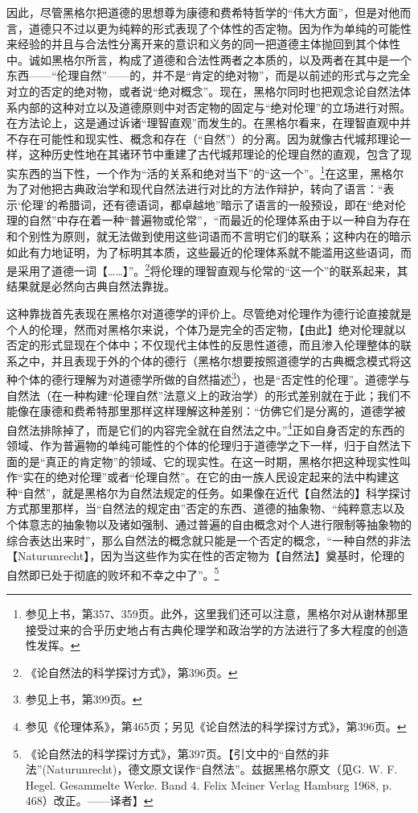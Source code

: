 因此，尽管黑格尔把道德的思想尊为康德和费希特哲学的“伟大方面”，但是对他而言，道德只不过以更为纯粹的形式表现了个体性的否定物。因为作为单纯的可能性来经验的并且与合法性分离开来的意识和义务的同一把道德主体抛回到其个体性中。诚如黑格尔所言，构成了道德和合法性两者之本质的，以及两者在其中是一个东西——“伦理自然”——的，并不是“肯定的绝对物”，而是以前述的形式与之完全对立的否定的绝对物，或者说“绝对概念”。现在，黑格尔同时也把观念论自然法体系内部的这种对立以及道德原则中对否定物的固定与“绝对伦理”的立场进行对照。在方法论上，这是通过诉诸“理智直观”而发生的。在黑格尔看来，在理智直观中并不存在可能性和现实性、概念和存在（“自然”）的分离。因为就像古代城邦理论一样，这种历史性地在其诸环节中重建了古代城邦理论的伦理自然的直观，包含了现实东西的当下性，一个作为“活的关系和绝对当下”的“这一个”。\footnote{参见上书，第357、359页。此外，这里我们还可以注意，黑格尔对从谢林那里接受过来的合乎历史地占有古典伦理学和政治学的方法进行了多大程度的创造性发挥。}在这里，黑格尔为了对他把古典政治学和现代自然法进行对比的方法作辩护，转向了语言：“表示‘伦理’的希腊词，还有德语词，都卓越地”暗示了语言的一般预设，即在“绝对伦理的自然”中存在着一种“普遍物或伦常”，“而最近的伦理体系由于以一种自为存在和个别性为原则，就无法做到使用这些词语而不言明它们的联系；这种内在的暗示如此有力地证明，为了标明其本质，这些最近的伦理体系就不能滥用这些语词，而是采用了道德一词【……】”。\footnote{《论自然法的科学探讨方式》，第396页。}将伦理的理智直观与伦常的“这一个”的联系起来，其结果就是必然向古典自然法靠拢。

这种靠拢首先表现在黑格尔对道德学的评价上。尽管绝对伦理作为德行论直接就是个人的伦理，然而对黑格尔来说，个体乃是完全的否定物，【由此】绝对伦理就以否定的形式显现在个体中；不仅现代主体性的反思性道德，而且渗入伦理整体的联系之中，并且表现于外的个体的德行（黑格尔想要按照道德学的古典概念模式将这种个体的德行理解为对道德学所做的自然描述\footnote{参见上书，第399页。}），也是“否定性的伦理”。道德学与自然法（在一种构建“伦理自然”法意义上的政治学）的形式差别就在于此；我们不能像在康德和费希特那里那样这样理解这种差别：“仿佛它们是分离的，道德学被自然法排除掉了，而是它们的内容完全就在自然法之中。”\footnote{参见《伦理体系》，第465页；另见《论自然法的科学探讨方式》，第396页。}正如自身否定的东西的领域、作为普遍物的单纯可能性的个体的伦理归于道德学之下一样，归于自然法下面的是“真正的肯定物”的领域、它的现实性。在这一时期，黑格尔把这种现实性叫作“实在的绝对伦理”或者“伦理自然”。在它的由一族人民设定起来的法中构建这种“自然”，就是黑格尔为自然法规定的任务。如果像在近代【自然法的】科学探讨方式那里那样，当“自然法的规定由”否定的东西、道德的抽象物、“纯粹意志以及个体意志的抽象物以及诸如强制、通过普遍的自由概念对个人进行限制等抽象物的综合表达出来时”，那么自然法的概念就只能是一个否定的概念，“一种自然的非法【Naturunrecht】，因为当这些作为实在性的否定物为【自然法】奠基时，伦理的自然即已处于彻底的败坏和不幸之中了”。\footnote{《论自然法的科学探讨方式》，第397页。【引文中的“自然的非法”(Naturunrecht)，德文原文误作“自然法”。兹据黑格尔原文（见G. W. F. Hegel. Gesammelte Werke. Band 4. Felix Meiner Verlag Hamburg 1968, p. 468）改正。——译者】}


